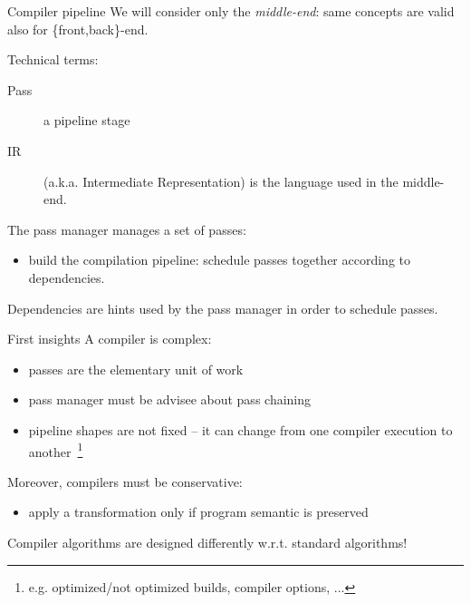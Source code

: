 \documentclass[10pt,mathserif]{beamer}
\begin{document}
\begin{frame}{Compiler pipeline}
We will consider only the \emph{middle-end}: same concepts are
valid also for \{front,back\}-end.

\vfill
Technical terms:
\begin{description}
\item[Pass] a pipeline stage
\item[IR] (a.k.a. Intermediate Representation) is the language used in the
          middle-end.
\end{description}

\vfill
The \alert{pass manager} manages a set of passes:
\begin{itemize}
\item build the compilation pipeline: \alert{schedule} passes together
      according to \alert{dependencies}.
\end{itemize}

\vfill
Dependencies are \alert{hints} used by the pass manager in order to schedule passes.
\end{frame}

\begin{frame}{First insights}
A compiler is \alert{complex}:

\begin{itemize}
\item passes are the \alert{elementary unit of work}
\item pass manager must be \alert{advisee} about pass chaining
\item pipeline shapes are \alert{not fixed} -- it can change from one compiler
      execution to another~\footnote{e.g. optimized/not optimized builds, compiler options, ...}
\end{itemize}

\vfill
Moreover, compilers must be \alert{conservative}:

\begin{itemize}
\item apply a transformation only if program \alert{semantic is preserved}
\end{itemize}

\vfill
Compiler algorithms are designed differently w.r.t. standard algorithms!
\end{frame}
\end{document}
